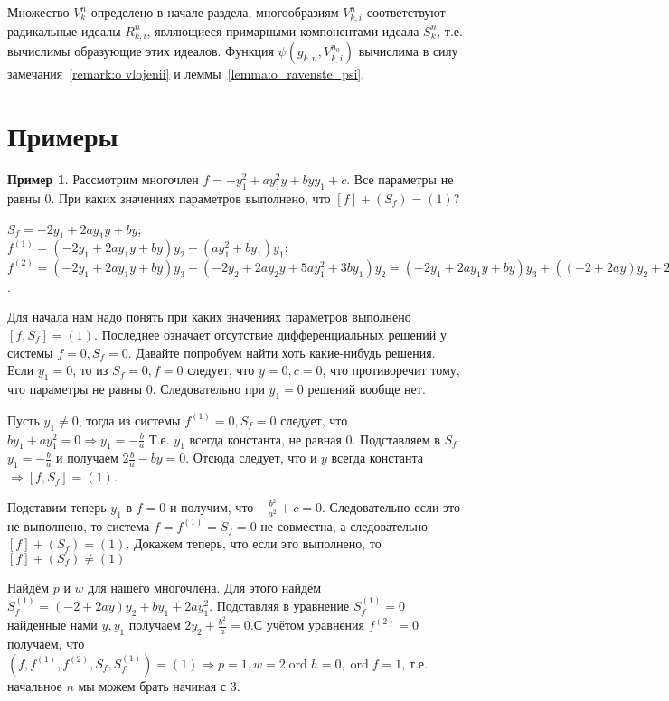 \documentclass[16pt]{article}
\DeclareMathOperator{\ord}{ord}
\theoremstyle{plain1}
\theoremstyle{plain2}
\theoremstyle{plain}
\theoremstyle{plain3}
\theoremstyle{definition}
\newtheorem{example}[theorem3]{Пример}
\theoremstyle{remark}
\begin{document}
Множество $V_k^{n}$ определено в начале раздела, многообразиям ${V}_{k,i}^{n}$ соответствуют радикальные идеалы $R_{k,i}^{n}$, являющиеся примарными компонентами идеала $S_k^n$, т.е. вычислимы образующие этих идеалов. 
Функция $\psi(g_{k,n},{V}_{k,i}^{n_0})$ вычислима в силу замечания~\ref{remark:o vlojenii} и леммы~\ref{lemma:o_ravenste_psi}.
\section{Примеры}


\begin{example}\label{example:first}
 Рассмотрим многочлен $f= -y_1^2+ay_1^2y+byy_1+c$.
Все параметры не равны 0. При каких значениях параметров выполнено,
что $[f]+(S_f)=(1)$?

$S_f=-2y_1+2ay_1y+by$;
\\
$f^{(1)}=(-2y_1+2ay_1y+by)y_2+(ay_1^2+by_1)y_1$;
\\
$f^{(2)}=(-2y_1+2ay_1y+by)y_3+(-2y_2+2ay_2y+5ay_1^2+3by_1)y_2=(-2y_1+2ay_1y+by)y_3+((-2+2ay)y_2+2ay_1^2)y_2+3(ay_1^2+by_1)y_2 $.

Для начала нам надо понять при каких значениях параметров выполнено
$[f,S_f]=(1)$. Последнее означает отсутствие дифференциальных решений
у системы $f=0, S_f=0$. Давайте попробуем найти хоть какие-нибудь решения.
Если $y_1=0$, то из $S_f=0, f=0$ следует, что $y=0, c =0$, что
противоречит тому, что параметры не равны 0. Следовательно при
$y_1=0$ решений вообще нет. 

Пусть $y_1\not=0$, тогда из системы $f^{(1)}=0, S_f=0$
следует, что $by_1+ay_1^2=0\Longrightarrow y_1=-\frac{b}{a}$ Т.е.
$y_1$ всегда константа, не равная 0. Подставляем в $S_f$ $y_1=-\frac{b}{a}$ и
получаем $2\frac{b}{a}-by=0$. Отсюда следует, что и $y$ всегда
константа $\Rightarrow [f,S_f]=(1) $.
 
 Подставим теперь $y_1$ в $f=0$ и получим, что $-\frac{b^2}{a^2}+c=0$.
Следовательно если это не выполнено, то система $f=f^{(1)}=S_f=0$ не
совместна, а следовательно $[f]+(S_f)=(1)$. Докажем теперь, что если это
выполнено, то $[f]+(S_f)\not=(1)$

Найдём $p$ и $w$ для нашего многочлена. Для этого найдём $
S_f^{(1)}=(-2+2ay)y_2+by_1+2ay_1^2$. Подставляя в уравнение $
S_f^{(1)}=0$ найденные нами $y,y_1$ получаем $ 2y_2+\frac{b^2}{a}=0$.С учётом уравнения $f^{(2)}=0$ получаем, что $\left(f,f^{(1)},f^{(2)},S_f, S_f^{(1)}\right)=(1)\Rightarrow p=1,w=2\ord{h}=0,\ord{f}=1$, т.е. начальное $n$  мы можем брать начиная с 3.


\end{example}
\end{document}
